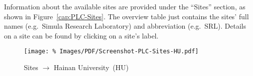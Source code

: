 Information about the available  sites are provided under the ``Sites'' section, as shown in Figure~\ref{cap:PLC-Sites}. The overview table just contains the sites' full names (e.g.\ Simula Research Laboratory) and abbreviation (e.g.\ SRL). Details on a site can be found by clicking on a site's label.

\begin{figure*}
\begin{center}
\texttt{[image: \%
   Images/PDF/Screenshot-PLC-Sites-HU.pdf]}
\end{center}
\caption{Sites $\rightarrow$ Hainan University~(HU)}
\label{cap:PLC-Sites-HU}
\end{figure*}

